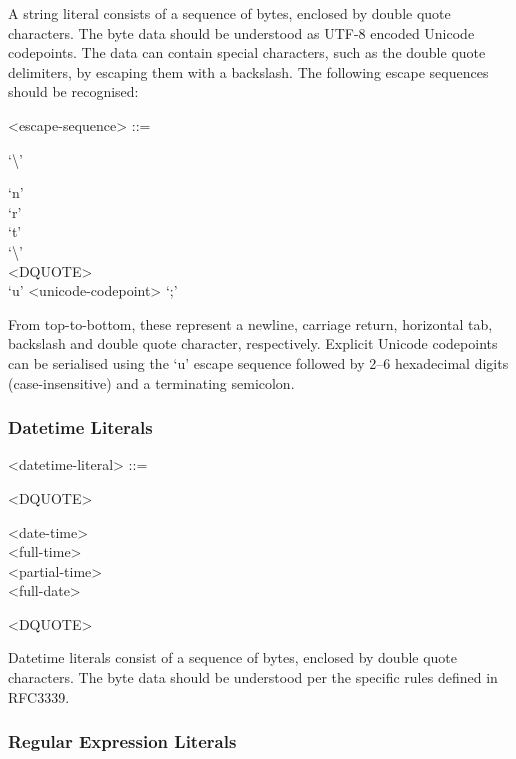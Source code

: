 A string literal consists of a sequence of bytes, enclosed by double
quote characters. The byte data should be understood as UTF-8 encoded
Unicode codepoints. The data can contain special characters, such as the
double quote delimiters, by escaping them with a backslash. The
following escape sequences should be recognised:

\begin{grammar}
  <escape-sequence> ::= \begin{syntdiag}
    `\textbackslash'
    \begin{stack}
      `n' \\
      `r' \\
      `t' \\
      `\textbackslash' \\
      <DQUOTE> \\
      `u' <unicode-codepoint> `;'
    \end{stack}
  \end{syntdiag}
\end{grammar}

From top-to-bottom, these represent a newline, carriage return,
horizontal tab, backslash and double quote character, respectively.
Explicit Unicode codepoints can be serialised using the `u' escape
sequence followed by 2--6 hexadecimal digits (case-insensitive) and a
terminating semicolon.

\subsubsection{Datetime Literals}

\begin{grammar}
  <datetime-literal> ::= \begin{syntdiag}
    <DQUOTE>
    \begin{stack}
      <date-time> \\
      <full-time> \\
      <partial-time> \\
      <full-date>
    \end{stack}
    <DQUOTE>
  \end{syntdiag}
\end{grammar}

Datetime literals consist of a sequence of bytes, enclosed by double
quote characters. The byte data should be understood per the specific
rules defined in RFC3339\cite{RFC3339}.

\subsubsection{Regular Expression Literals}

